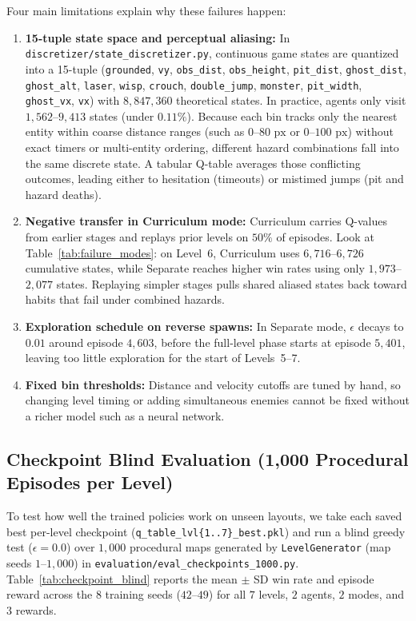 Four main limitations explain why these failures happen:
\begin{enumerate}
    \item \textbf{15-tuple state space and perceptual aliasing:} In \texttt{discretizer/state\_discretizer.py}, continuous game states are quantized into a 15-tuple (\texttt{grounded}, \texttt{vy}, \texttt{obs\_dist}, \texttt{obs\_height}, \texttt{pit\_dist}, \texttt{ghost\_dist}, \texttt{ghost\_alt}, \texttt{laser}, \texttt{wisp}, \texttt{crouch}, \texttt{double\_jump}, \texttt{monster}, \texttt{pit\_width}, \texttt{ghost\_vx}, \texttt{vx}) with $8{,}847{,}360$ theoretical states. In practice, agents only visit $1{,}562$--$9{,}413$ states (under $0.11\%$). Because each bin tracks only the nearest entity within coarse distance ranges (such as $0$--$80\text{ px}$ or $0$--$100\text{ px}$) without exact timers or multi-entity ordering, different hazard combinations fall into the same discrete state. A tabular Q-table averages those conflicting outcomes, leading either to hesitation (timeouts) or mistimed jumps (pit and hazard deaths).
    \item \textbf{Negative transfer in Curriculum mode:} Curriculum carries Q-values from earlier stages and replays prior levels on $50\%$ of episodes. Look at Table~\ref{tab:failure_modes}: on Level~6, Curriculum uses $6{,}716$--$6{,}726$ cumulative states, while Separate reaches higher win rates using only $1{,}973$--$2{,}077$ states. Replaying simpler stages pulls shared aliased states back toward habits that fail under combined hazards.
    \item \textbf{Exploration schedule on reverse spawns:} In Separate mode, $\epsilon$ decays to $0.01$ around episode $4{,}603$, before the full-level phase starts at episode $5{,}401$, leaving too little exploration for the start of Levels~5--7.
    \item \textbf{Fixed bin thresholds:} Distance and velocity cutoffs are tuned by hand, so changing level timing or adding simultaneous enemies cannot be fixed without a richer model such as a neural network.
\end{enumerate}

\subsection{Checkpoint Blind Evaluation (1,000 Procedural Episodes per Level)}
\label{subsec:checkpoint_eval}

To test how well the trained policies work on unseen layouts, we take each saved best per-level checkpoint (\texttt{q\_table\_lvl\{1..7\}\_best.pkl}) and run a blind greedy test ($\epsilon = 0.0$) over $1{,}000$ procedural maps generated by \texttt{LevelGenerator} (map seeds $1$--$1{,}000$) in \texttt{evaluation/eval\_checkpoints\_1000.py}. Table~\ref{tab:checkpoint_blind} reports the mean $\pm$ SD win rate and episode reward across the $8$ training seeds ($42$--$49$) for all $7$ levels, $2$ agents, $2$ modes, and $3$ rewards.

